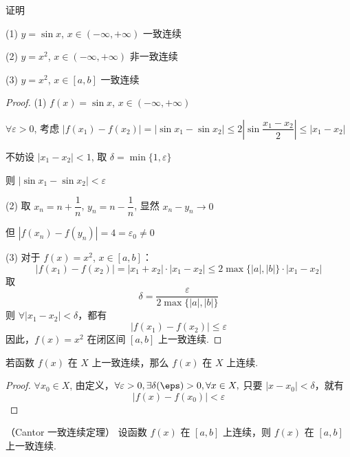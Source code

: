 \begin{example}
	证明
	
	(1) \( y = \sin x \), \( x \in (-\infty, +\infty) \) 一致连续
	
	(2) \( y = x^2 \), \( x \in (-\infty, +\infty) \) 非一致连续
	
	(3) \( y = x^2 \), \( x \in [a, b] \) 一致连续
\end{example}
\begin{proof}
	(1) \( f(x) = \sin x \), \( x \in (-\infty, +\infty) \)
	
	\(\forall \varepsilon > 0\), 考虑 \(|f(x_1) - f(x_2)|=|\sin x_1-\sin x_2| \leqslant 2 \left|\sin \dfrac{x_1 - x_2}{2}\right| \leqslant |x_1 - x_2|\)
	
	不妨设 \(|x_1 - x_2| < 1\), 取 \(\delta = \min\{1, \varepsilon\}\)
	
	则 \(|\sin x_1 - \sin x_2| < \varepsilon\)
	
	(2) 取 \(x_n = n + \dfrac{1}{n}\), \(y_n = n - \dfrac{1}{n}\), 显然 \(x_n - y_n \to 0\)
	
	但 \(|f(x_n) - f(y_n)| = 4 = \varepsilon_0 \neq 0\)
	
	(3) 对于 \( f(x) = x^2 \), \( x \in [a, b] \)：
	\[
	|f(x_1) - f(x_2)| = |x_1 + x_2| \cdot |x_1 - x_2| \leqslant 2 \max\{|a|, |b|\} \cdot |x_1 - x_2|
	\]
	取
	\[
	\delta = \frac{\varepsilon}{2 \max\{|a|, |b|\}}
	\]
	则 \(\forall |x_1 - x_2| < \delta\)，都有
	\[
	|f(x_1) - f(x_2)| \leqslant \varepsilon
	\]
	因此，\( f(x) = x^2 \) 在闭区间 \([a, b]\) 上一致连续.
	
\end{proof}
\begin{proposition}
	若函数 \( f(x) \) 在 \(X\) 上一致连续，那么 \( f(x) \) 在 $X$ 上连续.
\end{proposition}
\begin{proof}
	\(\forall x_0 \in X\), 由定义，\(\forall \varepsilon > 0, \exists \delta (\eps)> 0, \forall x \in X, \) 只要 \(|x - x_0| < \delta\)，就有$$|f(x) - f(x_0)| < \varepsilon$$ 
\end{proof}
\begin{theorem}
	（Cantor 一致连续定理）
	设函数 \( f(x) \) 在 \([a, b]\) 上连续，则 \( f(x) \) 在 \([a, b]\) 上一致连续.
\end{theorem}

